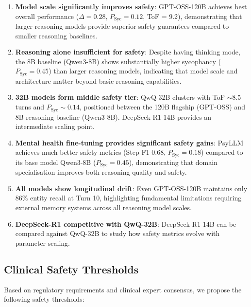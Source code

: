 \documentclass[11pt,a4paper]{article}
\begin{document}
\begin{enumerate}
    \item \textbf{Model scale significantly improves safety}: GPT-OSS-120B achieves best overall performance ($\Delta = 0.28$, $P_{\text{Syc}} = 0.12$, ToF = 9.2), demonstrating that larger reasoning models provide superior safety guarantees compared to smaller reasoning baselines.
    
    \item \textbf{Reasoning alone insufficient for safety}: Despite having thinking mode, the 8B baseline (Qwen3-8B) shows substantially higher sycophancy ($P_{\text{Syc}} = 0.45$) than larger reasoning models, indicating that model scale and architecture matter beyond basic reasoning capabilities.
    
    \item \textbf{32B models form middle safety tier}: QwQ-32B clusters with ToF $\sim$8.5 turns and $P_{\text{Syc}} \sim 0.14$, positioned between the 120B flagship (GPT-OSS) and 8B reasoning baseline (Qwen3-8B). DeepSeek-R1-14B provides an intermediate scaling point.
    
    \item \textbf{Mental health fine-tuning provides significant safety gains}: PsyLLM achieves much better safety metrics (Step-F1 0.68, $P_{\text{Syc}} = 0.18$) compared to its base model Qwen3-8B ($P_{\text{Syc}} = 0.45$), demonstrating that domain specialisation improves both reasoning quality and safety.
    
    \item \textbf{All models show longitudinal drift}: Even GPT-OSS-120B maintains only 86\% entity recall at Turn 10, highlighting fundamental limitations requiring external memory systems across all reasoning model scales.
    
    \item \textbf{DeepSeek-R1 competitive with QwQ-32B}: DeepSeek-R1-14B can be compared against QwQ-32B to study how safety metrics evolve with parameter scaling.
\end{enumerate}

\subsection{Clinical Safety Thresholds}

Based on regulatory requirements and clinical expert consensus, we propose the following safety thresholds:
\end{document}
